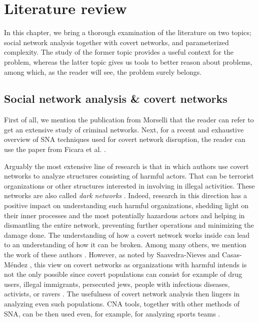 \chapter{Literature review}

In this chapter, we bring a thorough examination of the literature on two topics;
social network analysis together with covert networks, and parameterized complexity.
The study of the former topic provides a useful context for the \HL problem, whereas
the latter topic gives us tools to better reason about \NPh problems, among which, as the reader will see, the \HL problem surely belongs.

\section{Social network analysis \& covert networks}

First of all, we mention the publication from Morselli \cite{Morselli2009} that the reader can refer to get
an extensive study of criminal networks.
Next, for a recent and exhaustive overview of SNA techniques used for covert network disruption,
the reader can use the paper from Ficara et al. \cite{Ficara2022}.

Arguably the most extensive line of research is that in which authors use covert networks to analyze structures consisting of
harmful actors.
That can be terrorist organizations or other structures interested in involving in illegal activities. These networks are
also called \emph{dark networks} \cite{Raab2003}.
Indeed, research in this direction has a positive impact on understanding such harmful organizations,
shedding light on their inner processes and the most potentially hazardous actors and helping in dismantling the entire network,
preventing further operations and minimizing the damage done.
The understanding of how a covert network works inside can lead to an understanding of how it can be broken.
Among many others, we mention the work of these authors \cite{Waniek2017,Dey2019,Raab2003,Lindelauf2009,Xu2005,Ressler2006, SaavedraNieves2023}.
However, as noted by Saavedra-Nieves and Casas-Méndez \cite{SaavedraNieves2023}, this view on covert networks as organizations with harmful
intends is not the only possible since covert populations can consist for example of drug users, illegal immigrants, persecuted jews,
people with infectious diseases, activists, or ravers \cite{Oliver2014}.
The usefulness of covert network analysis then lingers in analyzing even such populations.
CNA tools, together with other methods of SNA, can be then used even, for example, for analyzing sports teams \cite{Buldú2019}.

